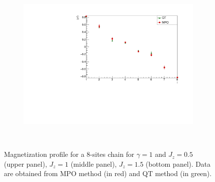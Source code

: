 \begin{figure}
\begin{subfigure}{\columnwidth}
        \includegraphics[scale=0.5]{Figures/LMComparison_8sJ10515.pdf}
        \label{fig:LMComparison_8sJ10515}
        \end{subfigure}\\
    \captionsetup{width=1.\linewidth}
    \caption{Magnetization profile for a 8-sites chain for $\gamma = 1$ and $J_z = 0.5$ (upper panel), $J_z = 1$ (middle panel), $J_z = 1.5$ (bottom panel). Data are obtained from MPO method (in red) and QT method (in green).}
    \label{fig:my_label}
\end{figure}


